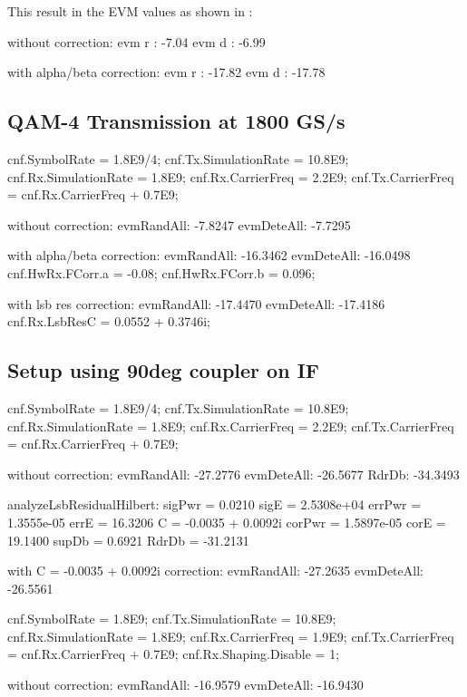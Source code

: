 This result in the EVM values as shown in :

without correction:
evm r : -7.04
evm d : -6.99

with alpha/beta correction:
evm r : -17.82
evm d : -17.78


\subsection{\gls{QAM}-4 Transmission at 1800 GS/s}
cnf.SymbolRate        = 1.8E9/4;
cnf.Tx.SimulationRate = 10.8E9;
cnf.Rx.SimulationRate = 1.8E9;
cnf.Rx.CarrierFreq    = 2.2E9;
cnf.Tx.CarrierFreq    = cnf.Rx.CarrierFreq + 0.7E9;

without correction:
evmRandAll: -7.8247
evmDeteAll: -7.7295

with alpha/beta correction:
evmRandAll: -16.3462
evmDeteAll: -16.0498
cnf.HwRx.FCorr.a = -0.08;
cnf.HwRx.FCorr.b = 0.096;

with lsb res correction:
evmRandAll: -17.4470
evmDeteAll: -17.4186
cnf.Rx.LsbResC = 0.0552 + 0.3746i;

\subsection{Setup using 90deg coupler on IF}

cnf.SymbolRate        = 1.8E9/4;
cnf.Tx.SimulationRate = 10.8E9;
cnf.Rx.SimulationRate = 1.8E9;
cnf.Rx.CarrierFreq    = 2.2E9;
cnf.Tx.CarrierFreq    = cnf.Rx.CarrierFreq + 0.7E9;

without correction:
evmRandAll: -27.2776
evmDeteAll: -26.5677
RdrDb: -34.3493

analyzeLsbResidualHilbert:
sigPwr = 0.0210
sigE =  2.5308e+04
errPwr =  1.3555e-05
errE =  16.3206
C = -0.0035 + 0.0092i
corPwr =  1.5897e-05
corE = 19.1400
supDb =  0.6921
RdrDb = -31.2131

with C = -0.0035 + 0.0092i correction:
evmRandAll: -27.2635
evmDeteAll: -26.5561

cnf.SymbolRate        = 1.8E9;
cnf.Tx.SimulationRate = 10.8E9;
cnf.Rx.SimulationRate = 1.8E9;
cnf.Rx.CarrierFreq    = 1.9E9;
cnf.Tx.CarrierFreq    = cnf.Rx.CarrierFreq + 0.7E9;
cnf.Rx.Shaping.Disable = 1;

without correction:
evmRandAll: -16.9579
evmDeteAll: -16.9430

